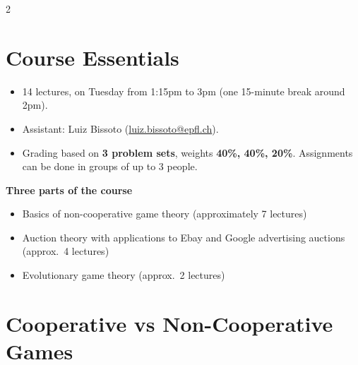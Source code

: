 \documentclass[a4paper,9pt]{extarticle}
\begin{document}

\thispagestyle{fancy}



\begin{multicols}{2}



\section{Course Essentials}


\begin{summary}

\begin{itemize}

\item 14 lectures, on Tuesday from 1\string:15pm to 3pm (one 15-minute break around 2pm).

\item Assistant: Luiz Bissoto (\href{mailto:luiz.bissoto@epfl.ch}{luiz.bissoto@epfl.ch}).

\item Grading based on \textbf{3 problem sets}, weights \textbf{40\%, 40\%, 20\%}.
Assignments can be done in groups of up to 3 people.

\end{itemize}

\end{summary}


\textbf{Three parts of the course}

\begin{itemize}

\item Basics of non-cooperative game theory (approximately 7 lectures)

\item Auction theory with applications to Ebay and Google advertising auctions (approx.\ 4 lectures)

\item Evolutionary game theory (approx.\ 2 lectures)

\end{itemize}



\section{Cooperative vs Non-Cooperative Games}



\end{multicols}
\end{document}
